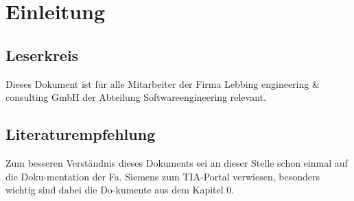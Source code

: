 \section{Einleitung}
\subsection{Leserkreis}
Dieses Dokument ist für alle Mitarbeiter der Firma Lebbing engineering \& consulting GmbH der Abteilung Softwareengineering relevant.

\subsection{Literaturempfehlung}
Zum besseren Verständnis dieses Dokuments sei an dieser Stelle schon einmal auf die Doku-mentation der Fa. Siemens zum TIA-Portal verwiesen, besonders wichtig sind dabei die Do-kumente aus dem Kapitel 0.
